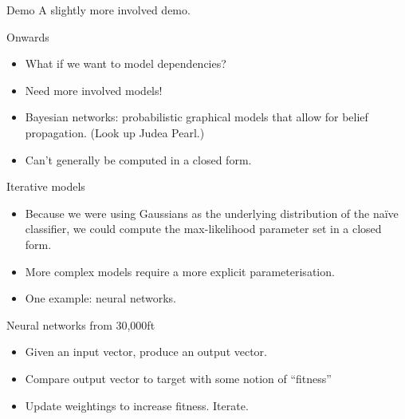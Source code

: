 \documentclass{beamer}
\begin{document}
\begin{frame}{Demo}
  A slightly more involved demo.
\end{frame}

\begin{frame}{Onwards}

  \begin{itemize}
    \item What if we want to model dependencies?
    \item Need more involved models!

    \item Bayesian networks: probabilistic graphical models that
      allow for belief propagation. (Look up Judea Pearl.)

    \item Can't generally be computed in a closed form.
  \end{itemize}

\end{frame}

\begin{frame}{Iterative models}
  \begin{itemize}
    \item Because we were using Gaussians as the underlying
      distribution of the na\"{i}ve classifier, we could compute the
      max-likelihood parameter set in a closed form.
    \item More complex models require a more explicit
      parameterisation.
    \item One example: neural networks.
  \end{itemize}
\end{frame}

\begin{frame}{Neural networks from 30,000ft}
  \begin{itemize}
    \item Given an input vector, produce an output vector.
    \item Compare output vector to target with some notion of
      ``fitness''
    \item Update weightings to increase fitness. Iterate.
  \end{itemize}
\end{frame}
\end{document}
